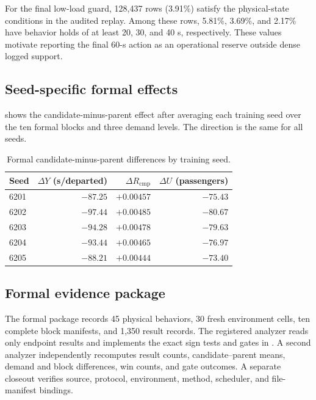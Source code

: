 For the final low-load guard, 128,437 rows (3.91\%) satisfy the physical-state
conditions in the audited replay. Among these rows, 5.81\%, 3.69\%, and 2.17\%
have behavior holds of at least 20, 30, and 40 s, respectively. These values
motivate reporting the final 60-s action as an operational reserve outside
dense logged support.

\subsection{Seed-specific formal effects}
\label{app:seed_effect}

 shows the candidate-minus-parent effect after averaging
each training seed over the ten formal blocks and three demand levels. The
direction is the same for all seeds.

\begin{table}[t]
\centering
\small
\caption{Formal candidate-minus-parent differences by training seed.}
\label{tab:seed_effect}
\begin{tabular}{lrrr}
\toprule
Seed & $\Delta Y$ (s/departed) & $\Delta R_{\mathrm{cmp}}$ & $\Delta U$ (passengers) \\
\midrule
6201 & $-87.25$ & $+0.00457$ & $-75.43$ \\
6202 & $-97.44$ & $+0.00485$ & $-80.67$ \\
6203 & $-94.28$ & $+0.00478$ & $-79.63$ \\
6204 & $-93.44$ & $+0.00465$ & $-76.97$ \\
6205 & $-88.21$ & $+0.00444$ & $-73.40$ \\
\bottomrule
\end{tabular}
\end{table}

\subsection{Formal evidence package}
\label{app:evidence}

The formal package records 45 physical behaviors, 30 fresh environment cells,
ten complete block manifests, and 1,350 result records. The registered analyzer
reads only endpoint results and implements the exact sign tests and gates in
. A second analyzer independently recomputes result
counts, candidate--parent means, demand and block differences, win counts, and
gate outcomes. A separate closeout verifies source, protocol, environment,
method, scheduler, and file-manifest bindings.

